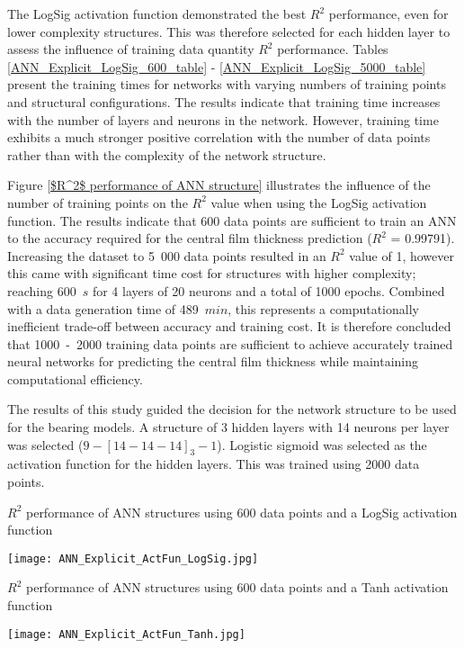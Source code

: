 The LogSig activation function demonstrated the best $R^2$ performance, even for lower complexity structures. This was therefore selected for each hidden layer to assess the influence of training data quantity $R^2$ performance. Tables \ref{ANN_Explicit_LogSig_600_table} - \ref{ANN_Explicit_LogSig_5000_table} present the training times for networks with varying numbers of training points and structural configurations. The results indicate that training time increases with the number of layers and neurons in the network. However, training time exhibits a much stronger positive correlation with the number of data points rather than with the complexity of the network structure.

Figure \ref{$R^2$ performance of ANN structure} illustrates the influence of the number of training points on the $R^2$ value when using the LogSig activation function. The results indicate that 600 data points are sufficient to train an ANN to the accuracy required for the central film thickness prediction ($R^2$ = 0.99791). Increasing the dataset to 5~000 data points resulted in an $R^2$ value of 1, however this came with significant time cost for structures with higher complexity; reaching 600~$s$ for 4 layers of 20 neurons and a total of 1000 epochs. Combined with a data generation time of 489~$min$, this represents a computationally inefficient trade-off between accuracy and training cost. It is therefore concluded that 1000~-~2000 training data points are sufficient to achieve accurately trained neural networks for predicting the central film thickness while maintaining computational efficiency.

The results of this study guided the decision for the network structure to be used for the bearing models. A structure of 3 hidden layers with 14 neurons per layer was selected ($9-[14-14-14]_3-1$). Logistic sigmoid was selected as the activation function for the hidden layers. This was trained using 2000 data points.

\begin{table}
	\caption{$R^2$ performance of ANN structures using 600 data points and a LogSig activation function}
	\label{LogSig_table}
	\texttt{[image: ANN\_Explicit\_ActFun\_LogSig.jpg]}
\end{table}

\begin{table}
	\caption{$R^2$ performance of ANN structures using 600 data points and a Tanh activation function}
	\label{Tanh_table}
	\texttt{[image: ANN\_Explicit\_ActFun\_Tanh.jpg]}
\end{table}


